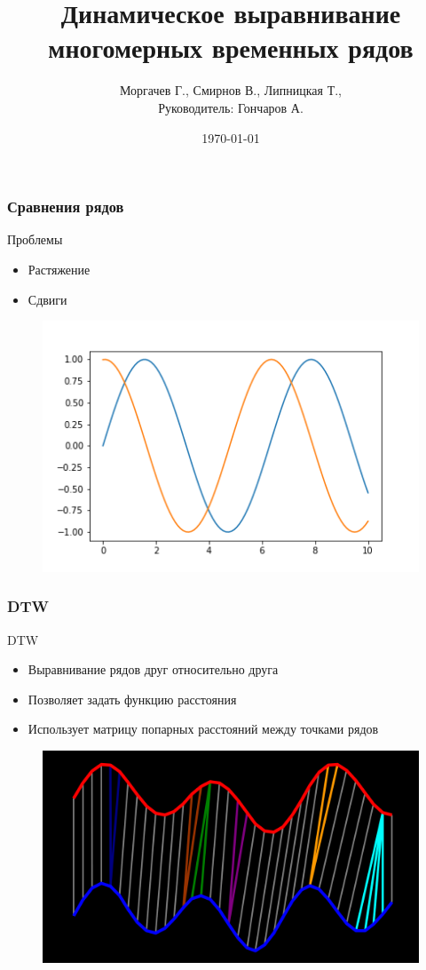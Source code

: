 \documentclass{beamer}
\title[DTW]{Динамическое выравнивание многомерных временных рядов}
\author{Моргачев Г., Смирнов В., Липницкая Т., \\ Руководитель: Гончаров А.}
\date{\today}
\begin{document}

\begin{frame}
\titlepage 
\end{frame}


\begin{frame}
\frametitle{Сравнения рядов}
	\begin{block}{Проблемы}
        \begin{itemize}
            \item Растяжение
            \item Сдвиги
        \end{itemize}
    \end{block}
    \begin{figure}
        \includegraphics[width=0.6\linewidth]{2}
    \end{figure}
\end{frame}


\begin{frame}
\frametitle{DTW}
    \begin{block}{DTW}
        \begin{itemize}
            \item Выравнивание рядов друг относительно друга
            \item Позволяет задать функцию расстояния
            \item Использует матрицу попарных расстояний между точками рядов
        \end{itemize} 
    \end{block}
    \begin{figure}
        \includegraphics[width=0.6\linewidth]{1}
    \end{figure}
\end{frame}
    
\end{document}
